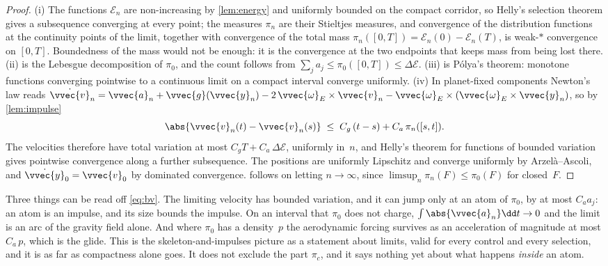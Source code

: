 \begin{proof}
(i) The functions $\mathcal{E}_n$ are non-increasing by \cref{lem:energy}
and uniformly bounded on the compact corridor, so Helly's selection theorem
gives a subsequence converging at every point; the measures $\pi_n$ are
their Stieltjes measures, and convergence of the distribution functions at
the continuity points of the limit, together with convergence of the total
mass $\pi_n([0,T]) = \mathcal{E}_n(0)-\mathcal{E}_n(T)$, is weak-$*$
convergence on $[0,T]$. Boundedness of the mass would not be enough: it is
the convergence at the two endpoints that keeps mass from being lost
there. (ii) is the Lebesgue decomposition of $\pi_0$, and
the count follows from $\sum_j a_j\le\pi_0([0,T])\le\Delta\mathcal{E}$.
(iii) is P\'olya's theorem: monotone functions converging pointwise to a
continuous limit on a compact interval converge uniformly. (iv) In
planet-fixed components Newton's law reads
$\dot{\vvec{v}}_n = \vvec{a}_n + \vvec{g}(\vvec{y}_n)
 - 2\,\vvec{\omega}_E\times\vvec{v}_n
 - \vvec{\omega}_E\times(\vvec{\omega}_E\times\vvec{y}_n)$,
so by \cref{lem:impulse}
\[
  \abs{\vvec{v}_n(t)-\vvec{v}_n(s)}
  \;\le\; C_g\,(t-s) + C_a\,\pi_n([s,t]) .
\]
The velocities therefore have total variation at most
$C_g T + C_a\,\Delta\mathcal{E}$, uniformly in~$n$, and Helly's theorem for
functions of bounded variation gives pointwise convergence along a further
subsequence. The positions are uniformly Lipschitz and converge uniformly
by Arzel\`a--Ascoli, and $\dot{\vvec{y}}_0=\vvec{v}_0$ by dominated
convergence.  follows on letting $n\to\infty$, since
$\limsup_n\pi_n(F)\le\pi_0(F)$ for closed~$F$.
\end{proof}

Three things can be read off \cref{eq:bv}. The limiting velocity has bounded
variation, and it can jump only at an atom of $\pi_0$, by at most
$C_a a_j$: an atom is an impulse, and its size bounds the impulse. On an
interval that $\pi_0$ does not charge, $\int\abs{\vvec{a}_n}\dd t\to 0$ and
the limit is an arc of the gravity field alone. And where $\pi_0$ has a
density~$p$ the aerodynamic forcing survives as an acceleration of
magnitude at most $C_a\,p$, which is the glide. This is the
skeleton-and-impulses picture as a statement about
limits, valid for every control and every selection, and it is as far as
compactness alone goes. It does not exclude the part $\pi_c$, and it says
nothing yet about what happens \emph{inside} an atom.

